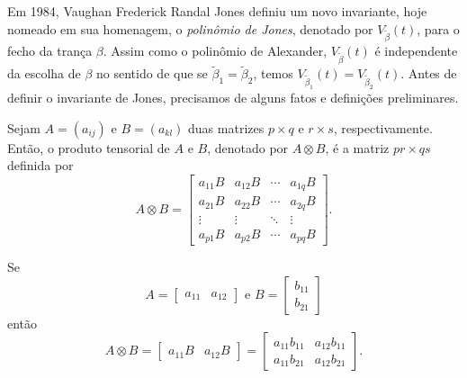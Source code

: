 	\par\vspace{0.3cm} Em 1984, Vaughan Frederick Randal Jones definiu um novo invariante, 
	hoje nomeado em sua homenagem, o \textit{polinômio de Jones}, denotado por 
	$V_{\widetilde{\beta}}(t)$, para o fecho da trança $\beta$. Assim como o polinômio de Alexander,
	$V_{\widetilde{\beta}}(t)$ é independente da escolha de $\beta$ no sentido de que se 
	$\widetilde{\beta}_1 = \widetilde{\beta}_2$, temos 
	$V_{\widetilde{\beta}_1}(t) = V_{\widetilde{\beta}_2}(t)$. Antes de definir o invariante de 
	Jones, precisamos de alguns fatos e definições preliminares.
	\begin{definition}
	\label{def prod tensorial}
		Sejam $A = (a_{ij})$ e $B = (a_{kl})$ duas matrizes $p\times q$ e $r\times s$, 
		respectivamente. Então, o produto tensorial de $A$ e $B$, denotado por $A\otimes B$, 
		é a matriz $pr\times qs$ definida por
		\begin{equation*}
    		A\otimes B = 
    		\begin{bmatrix}
    		a_{11}B & a_{12}B & \cdots & a_{1q}B \\
    		a_{21}B & a_{22}B & \cdots & a_{2q}B \\
    		\vdots & \vdots & \ddots & \vdots \\
    		a_{p1}B & a_{p2}B & \cdots & a_{pq}B
    		\end{bmatrix}.
		\end{equation*}
	\end{definition}
	\begin{example}
	    Se
    	\begin{equation*}
        	A = \begin{bmatrix}
        	a_{11} & a_{12}
        	\end{bmatrix}\text{ e } B = \begin{bmatrix}
        	b_{11}\\
        	b_{21}
        	\end{bmatrix} 
        \end{equation*}
        então
        \begin{equation*}
        	A\otimes B = \begin{bmatrix}
        	a_{11}B & a_{12}B
        	\end{bmatrix} = \begin{bmatrix}
        	a_{11}b_{11} & a_{12}b_{11}\\
        	a_{11}b_{21} & a_{12}b_{21}
        	\end{bmatrix}.
    	\end{equation*}
	\end{example}

